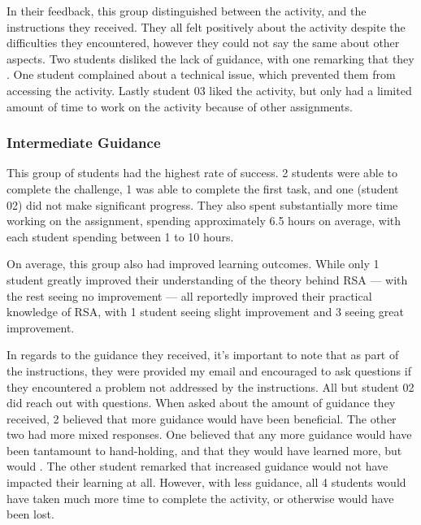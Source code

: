             In their feedback, this group distinguished between the activity, and the instructions they received. 
            They all felt positively about the activity despite the difficulties they encountered, however they could not say the same about other aspects. 
            Two students disliked the lack of guidance, with one remarking that they . 
            One student complained about a technical issue, which prevented them from accessing the activity. 
            Lastly student 03 liked the activity, but only had a limited amount of time to work on the activity because of other assignments. 
        
        \subsubsection*{Intermediate Guidance}
            This group of students had the highest rate of success. 
            2 students were able to complete the challenge, 1 was able to complete the first task, and one (student 02) did not make significant progress. 
            They also spent substantially more time working on the assignment, spending approximately 6.5 hours on average, with each student spending between 1 to 10 hours.

            On average, this group also had improved learning outcomes. 
            While only 1 student greatly improved their understanding of the theory behind RSA --- 
            with the rest seeing no improvement --- 
            all reportedly improved their practical knowledge of RSA, with 1 student seeing slight improvement and 3 seeing great improvement. 

            In regards to the guidance they received, it's important to note that as part of the instructions, they were provided my email and encouraged to ask questions if they encountered a problem not addressed by the instructions. 
            All but student 02 did reach out with questions. 
            When asked about the amount of guidance they received, 2 believed that more guidance would have been beneficial. 
            The other two had more mixed responses. One believed that any more guidance would have been tantamount to hand-holding, and that they would have learned more, but would . 
            The other student remarked that increased guidance would not have impacted their learning at all. 
            However, with less guidance, all 4 students would have taken much more time to complete the activity, or otherwise would have been lost. 

